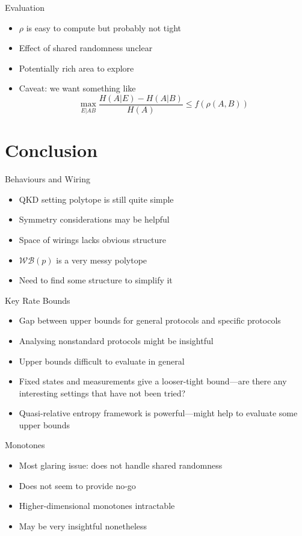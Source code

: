 \documentclass[xcolor=dvipsnames]{beamer}
\newcommand{\?}{\mathrel{?}} %
\newcommand{\sWB}{\mathcal{WB}}
\begin{document}
\begin{frame}{Evaluation}
  \begin{itemize}[<+->]
    \item \(\rho\) is easy to compute but probably not tight
    \item Effect of shared randomness unclear
    \item Potentially rich area to explore
    \item Caveat: we want something like
      \[ \max_{E|AB} \frac{H(A|E) - H(A|B)}{H(A)} \leq f(\rho(A,B)) \]
  \end{itemize}
\end{frame}

\section*{Conclusion}

\begin{frame}{Behaviours and Wiring}
  \begin{itemize}[<+->]
    \item QKD setting polytope is still quite simple
    \item Symmetry considerations may be helpful
    \item Space of wirings lacks obvious structure
    \item \(\sWB(p)\) is a very messy polytope
    \item Need to find some structure to simplify it
  \end{itemize}
\end{frame}

\begin{frame}{Key Rate Bounds}
  \begin{itemize}[<+->]
    \item Gap between upper bounds for general protocols and specific protocols
    \item Analysing nonstandard protocols might be insightful
    \item Upper bounds difficult to evaluate in general
    \item Fixed states and measurements give a looser-tight bound---are there any interesting settings that have not been tried?
    \item Quasi-relative entropy framework is powerful---might help to evaluate some upper bounds
  \end{itemize}
\end{frame}

\begin{frame}{Monotones}
  \begin{itemize}[<+->]
    \item Most glaring issue: does not handle shared randomness
    \item Does not seem to provide no-go
    \item Higher-dimensional monotones intractable
    \item May be very insightful nonetheless
  \end{itemize}
\end{frame}
\end{document}
